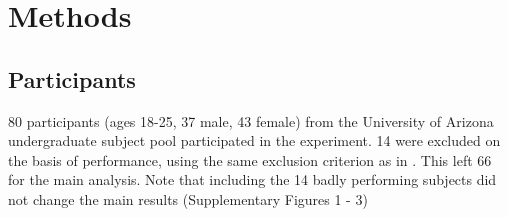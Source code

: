 \documentclass[12pt]{article}
\begin{document}
	
	
	
	\section*{Methods}
	\subsection*{Participants}
	
	80 participants (ages 18-25, 37 male, 43 female) from the University of Arizona undergraduate subject pool participated in the experiment. 14 were excluded on the basis of performance, using the same exclusion criterion as in \citep{wilson2014}. This left 66 for the main analysis. Note that including the 14 badly performing subjects did not change the main results (Supplementary Figures 1 - 3)%
	
	
	
\end{document}
